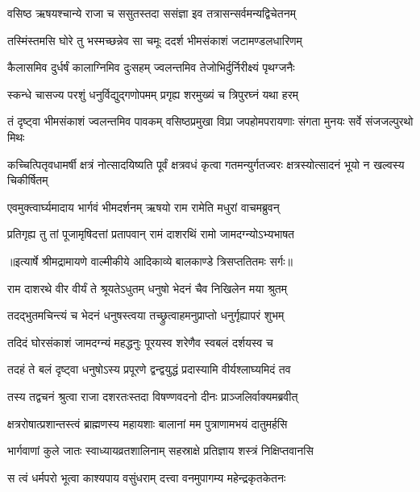 \twolineshloka
{वसिष्ठ ऋषयश्चान्ये राजा च ससुतस्तदा}
{ससंज्ञा इव तत्रासन्सर्वमन्यद्विचेतनम्} %

\twolineshloka
{तस्मिंस्तमसि घोरे तु भस्मच्छन्नेव सा चमूः}
{ददर्श भीमसंकाशं जटामण्डलधारिणम्} %

\twolineshloka
{कैलासमिव दुर्धर्षं कालाग्निमिव दुःसहम्}
{ज्वलन्तमिव तेजोभिर्दुर्निरीक्ष्यं पृथग्जनैः} %

\twolineshloka
{स्कन्धे चासज्य परशुं धनुर्विद्युद्गणोपमम्}
{प्रगृह्य शरमुख्यं च त्रिपुरघ्नं यथा हरम्} %

\threelineshloka
{तं दृष्ट्वा भीमसंकाशं ज्वलन्तमिव पावकम्}
{वसिष्ठप्रमुखा विप्रा जपहोमपरायणाः}
{संगता मुनयः सर्वे संजजल्पुरथो मिथः} %

\threelineshloka
{कच्चित्पितृवधामर्षी क्षत्रं नोत्सादयिष्यति}
{पूर्वं क्षत्रवधं कृत्वा गतमन्युर्गतज्वरः}
{क्षत्रस्योत्सादनं भूयो न खल्वस्य चिकीर्षितम्} %

\twolineshloka
{एवमुक्त्वार्घ्यमादाय भार्गवं भीमदर्शनम्}
{ऋषयो राम रामेति मधुरां वाचमब्रुवन्} %

\twolineshloka
{प्रतिगृह्य तु तां पूजामृषिदत्तां प्रतापवान्}
{रामं दाशरथिं रामो जामदग्न्योऽभ्यभाषत} %


{॥इत्यार्षे श्रीमद्रामायणे वाल्मीकीये आदिकाव्ये बालकाण्डे त्रिसप्ततितमः सर्गः॥}


\twolineshloka
{राम दाशरथे वीर वीर्यं ते श्रूयतेऽधुतम्}
{धनुषो भेदनं चैव निखिलेन मया श्रुतम्} %

\twolineshloka
{तदद्भुतमचिन्त्यं च भेदनं धनुषस्त्वया}
{तच्छ्रुत्वाहमनुप्राप्तो धनुर्गृह्यापरं शुभम्} %

\twolineshloka
{तदिदं घोरसंकाशं जामदग्न्यं महद्धनुः}
{पूरयस्व शरेणैव स्वबलं दर्शयस्व च} %

\twolineshloka
{तदहं ते बलं दृष्ट्वा धनुषोऽस्य प्रपूरणे}
{द्वन्द्वयुद्धं प्रदास्यामि वीर्यश्लाघ्यमिदं तव} %

\twolineshloka
{तस्य तद्वचनं श्रुत्वा राजा दशरतःस्तदा}
{विषण्णवदनो दीनः प्राञ्जलिर्वाक्यमब्रवीत्} %

\twolineshloka
{क्षत्ररोषात्प्रशान्तस्त्वं ब्राह्मणस्य महायशाः}
{बालानां मम पुत्राणामभयं दातुमर्हसि} %

\twolineshloka
{भार्गवाणां कुले जातः स्वाध्यायव्रतशालिनाम्}
{सहस्राक्षे प्रतिज्ञाय शस्त्रं निक्षिप्तवानसि} %

\twolineshloka
{स त्वं धर्मपरो भूत्वा काश्यपाय वसुंधराम्}
{दत्त्वा वनमुपागम्य महेन्द्रकृतकेतनः} %

